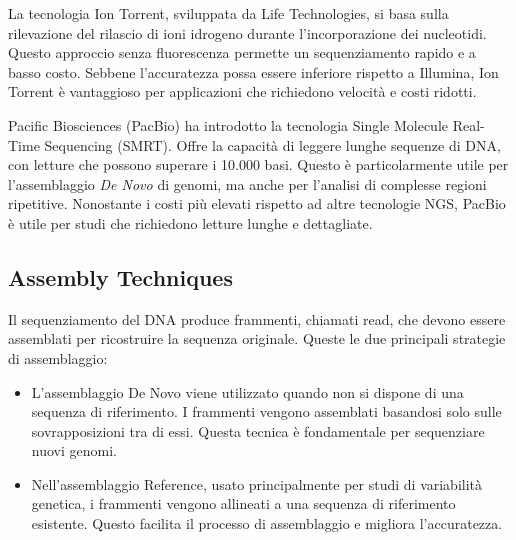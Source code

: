 	La tecnologia Ion Torrent, sviluppata da Life Technologies, si basa sulla rilevazione del rilascio di ioni idrogeno durante l'incorporazione dei nucleotidi. Questo approccio senza fluorescenza permette un sequenziamento rapido e a basso costo. Sebbene l'accuratezza possa essere inferiore rispetto a Illumina, Ion Torrent è vantaggioso per applicazioni che richiedono velocità e costi ridotti.
	
	Pacific Biosciences (PacBio) ha introdotto la tecnologia Single Molecule Real-Time Sequencing (SMRT). Offre la capacità di leggere lunghe sequenze di DNA, con letture che possono superare i 10.000 basi. Questo è particolarmente utile per l'assemblaggio \emph{De Novo} di genomi, ma anche per l'analisi di complesse regioni ripetitive. Nonostante i costi più elevati rispetto ad altre tecnologie NGS, PacBio è utile per studi che richiedono letture lunghe e dettagliate.



	\subsection{Assembly Techniques}
	\label{subsec:assembly-techniques}
	
	Il sequenziamento del DNA produce frammenti, chiamati read, che devono essere assemblati per ricostruire la sequenza originale. Queste le due principali strategie di assemblaggio:
	\begin{itemize}
		\item L'assemblaggio De Novo viene utilizzato quando non si dispone di una sequenza di riferimento. I frammenti vengono assemblati basandosi solo sulle sovrapposizioni tra di essi. Questa tecnica è fondamentale per sequenziare nuovi genomi.
		
		\item Nell'assemblaggio Reference, usato principalmente per studi di variabilità genetica, i frammenti vengono allineati a una sequenza di riferimento esistente. Questo facilita il processo di assemblaggio e migliora l'accuratezza.
	\end{itemize}
